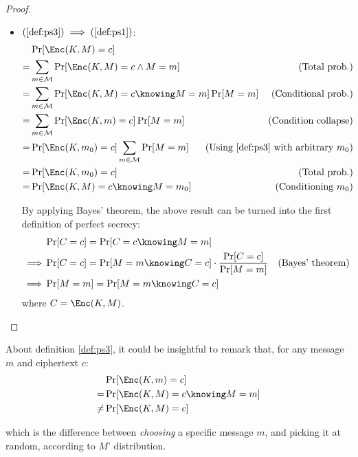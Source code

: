 \begin{proof}
\begin{itemize}
        \item $(\ref{def:ps3}) \implies (\ref{def:ps1})$:
        \begin{align*}
             & \Pr[\Enc(K, M) = c]                                          & \\
            =& \sum_{m \in \M}\Pr[\Enc(K, M) = c \wedge M = m]              & \text{(Total prob.)} \\
            =& \sum_{m \in \M}\Pr[\Enc(K, M) = c \knowing M = m] \Pr[M = m] & \text{(Conditional prob.)} \\
            =& \sum_{m \in \M}\Pr[\Enc(K, m) = c] \Pr[M = m]                & \text{(Condition collapse)} \\
            =& \Pr[\Enc(K, m_0) = c] \sum_{m \in \M} \Pr[M = m]             & \mathllap{\text{(Using \ref{def:ps3} with arbitrary $m_0$})} \\
            =& \Pr[\Enc(K, m_0) = c]                                        & \text{(Total prob.)} \\
            =& \Pr[\Enc(K, M) = c \knowing M = m_0]                         & \text{(Conditioning $m_0$)}
        \end{align*}

        By applying Bayes' theorem, the above result can be turned into the first definition of perfect secrecy:
        \begin{align*}
                    & \Pr[C = c] = \Pr[C = c \knowing M = m]                                        & \\
            \implies& \Pr[C = c] = \Pr[M = m \knowing C = c] \cdot \frac{\Pr[C = c]}{\Pr[M = m]}    & \text{(Bayes' theorem)} \\
            \implies& \Pr[M = m] = \Pr[M = m \knowing C = c]                                        &
        \end{align*}
        where $C = \Enc(K, M)$.
    \end{itemize}
\end{proof}

About definition \ref{def:ps3}, it could be insightful to remark that, for any message $m$ and ciphertext $c$:
\begin{align*}
        & \Pr[\Enc(K, m) = c] \\
       =& \Pr[\Enc(K, M) = c \knowing M = m] \\
    \neq& \Pr[\Enc(K, M) = c]
\end{align*}

which is the difference between \emph{choosing} a specific message $m$, and picking it at random, according to $M$' distribution.

